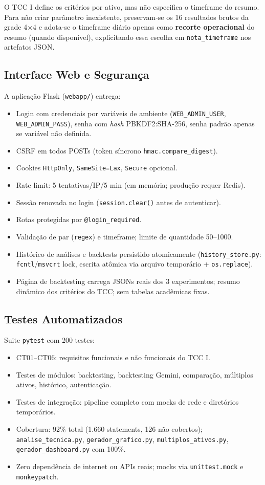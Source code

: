\documentclass[conference]{IEEEtran}
\begin{document}
O TCC I define os critérios por ativo, mas não especifica o timeframe do resumo. Para não criar parâmetro inexistente, preservam-se os 16 resultados brutos da grade 4×4 e adota-se o timeframe diário apenas como \textbf{recorte operacional} do resumo (quando disponível), explicitando essa escolha em \texttt{nota\_timeframe} nos artefatos JSON.

\subsection{Interface Web e Segurança}

A aplicação Flask (\texttt{webapp/}) entrega:
\begin{itemize}
  \item Login com credenciais por variáveis de ambiente (\texttt{WEB\_ADMIN\_USER}, \texttt{WEB\_ADMIN\_PASS}), senha com \textit{hash} PBKDF2:SHA-256, senha padrão apenas se variável não definida.
  \item CSRF em todos POSTs (token síncrono \texttt{hmac.compare\_digest}).
  \item Cookies \texttt{HttpOnly}, \texttt{SameSite=Lax}, \texttt{Secure} opcional.
  \item Rate limit: 5 tentativas/IP/5 min (em memória; produção requer Redis).
  \item Sessão renovada no login (\texttt{session.clear()} antes de autenticar).
  \item Rotas protegidas por \texttt{@login\_required}.
  \item Validação de par (\texttt{regex}) e timeframe; limite de quantidade 50–1000.
  \item Histórico de análises e backtests persistido atomicamente (\texttt{history\_store.py}: \texttt{fcntl}/\texttt{msvcrt} lock, escrita atômica via arquivo temporário + \texttt{os.replace}).
  \item Página de backtesting carrega JSONs reais dos 3 experimentos; resumo dinâmico dos critérios do TCC; sem tabelas acadêmicas fixas.
\end{itemize}

\subsection{Testes Automatizados}

Suite \texttt{pytest} com 200 testes:
\begin{itemize}
  \item CT01–CT06: requisitos funcionais e não funcionais do TCC I.
  \item Testes de módulos: backtesting, backtesting Gemini, comparação, múltiplos ativos, histórico, autenticação.
  \item Testes de integração: pipeline completo com mocks de rede e diretórios temporários.
  \item Cobertura: 92\% total (1.660 statements, 126 não cobertos); \texttt{analise\_tecnica.py}, \texttt{gerador\_grafico.py}, \texttt{multiplos\_ativos.py}, \texttt{gerador\_dashboard.py} com 100\%.
  \item Zero dependência de internet ou APIs reais; mocks via \texttt{unittest.mock} e \texttt{monkeypatch}.
\end{itemize}
\end{document}
